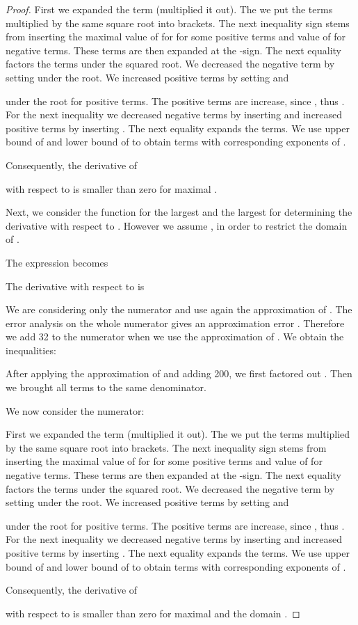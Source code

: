 \documentclass{article}
\begin{document}
\begin{proof}
First we expanded the term (multiplied it out).
The we put the terms multiplied by the same square root into brackets.
The next inequality sign stems from inserting the maximal value of  for  for
some positive terms and value of  for negative terms. 
These terms are then expanded at the -sign.
The next equality factors the terms under the squared root.
We decreased the negative term by setting
 under the root.
We increased positive terms by setting  
 and

under the root for positive terms.
The positive terms are increase, since
, thus
.
For the next inequality we decreased negative terms by inserting
 and increased positive terms by inserting
. The next equality expands the terms.
We use upper bound of  and lower bound of  to obtain terms with
corresponding exponents of .

Consequently, the derivative of

with respect to  is smaller than zero for maximal .

Next,
we consider the function for  
the largest  and the largest  
for determining the derivative with respect to . 
However we assume , in order to restrict the
domain of .

The expression becomes


The derivative with respect to  is 


We are considering only the numerator and use again the approximation
of \citet{Ren:07}.
The error analysis on the whole numerator gives an approximation error . Therefore
we add 32 to the numerator when we use the approximation of \citet{Ren:07}.
We obtain the inequalities:

After applying the approximation
of \citet{Ren:07} and adding 200,
we first factored out .
Then we brought all terms to the same denominator.

We now consider the numerator:


First we expanded the term (multiplied it out).
The we put the terms multiplied by the same square root into brackets.
The next inequality sign stems from inserting the maximal value of  for  for
some positive terms and value of  for negative terms. 
These terms are then expanded at the -sign.
The next equality factors the terms under the squared root.
We decreased the negative term by setting
 under the root.
We increased positive terms by setting  
 and

under the root for positive terms.
The positive terms are increase, since
, thus
.
For the next inequality we decreased negative terms by inserting
 and increased positive terms by inserting
. The next equality expands the terms.
We use upper bound of  and lower bound of  to obtain terms with
corresponding exponents of .

{Consequently}, the derivative of

with respect to  is smaller than zero for maximal
 and the domain .
\end{proof}
\end{document}
